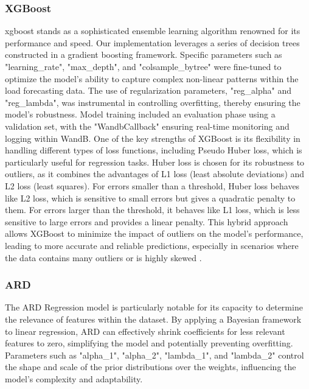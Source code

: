 \documentclass{article} %
\begin{document}
\subsubsection{XGBoost}
\Gls*{xgboost} stands as a sophisticated ensemble learning algorithm renowned for its performance and speed. Our implementation leverages a series of decision trees constructed in a gradient boosting framework. Specific parameters such as "learning\_rate", "max\_depth", and "colsample\_bytree" were fine-tuned to optimize the model's ability to capture complex non-linear patterns within the load forecasting data. The use of regularization parameters, "reg\_alpha" and "reg\_lambda", was instrumental in controlling overfitting, thereby ensuring the model's robustness. Model training included an evaluation phase using a validation set, with the "WandbCallback" ensuring real-time monitoring and logging within \gls*{WandB}.
One of the key strengths of XGBoost is its flexibility in handling different types of loss functions, including Pseudo Huber loss, which is particularly useful for regression tasks. Huber loss is chosen for its robustness to outliers, as it combines the advantages of L1 loss (least absolute deviations) and L2 loss (least squares). For errors smaller than a threshold, Huber loss behaves like L2 loss, which is sensitive to small errors but gives a quadratic penalty to them. For errors larger than the threshold, it behaves like L1 loss, which is less sensitive to large errors and provides a linear penalty. This hybrid approach allows XGBoost to minimize the impact of outliers on the model's performance, leading to more accurate and reliable predictions, especially in scenarios where the data contains many outliers or is highly skewed \cite{kulisz2024optimizing}.

\subsubsection{ARD}
The \gls*{ARD} Regression model is particularly notable for its capacity to determine the relevance of features within the dataset. By applying a Bayesian framework to linear regression, \gls*{ARD} can effectively shrink coefficients for less relevant features to zero, simplifying the model and potentially preventing overfitting. Parameters such as "alpha\_1", "alpha\_2", "lambda\_1", and "lambda\_2" control the shape and scale of the prior distributions over the weights, influencing the model's complexity and adaptability. 
\end{document}
